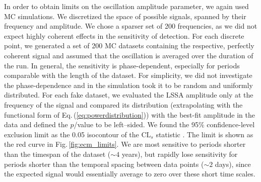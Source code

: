 In order to obtain limits on the oscillation amplitude parameter, we again used MC simulations. We discretized the space of possible signals, spanned by their frequency and amplitude. We chose a sparser set of 200 frequencies, as we did not expect highly coherent effects in the sensitivity of detection. For each discrete point, we generated a set of 200 MC
datasets containing the respective, perfectly coherent signal and assumed that the oscillation is averaged over the duration of the run. In general, the sensitivity is phase-dependent, especially for periods comparable with the length of the dataset. For simplicity, we did not investigate the phase-dependence and in the simulation took it to be random and uniformly distributed.
For each fake dataset, we evaluated the LSSA amplitude only at the frequency of the signal and compared its distribution (extrapolating with the functional form of Eq.\,(\ref{eq:powerdistribution})) with the best-fit amplitude in the data and defined the $p$\-/value to be left--sided. We found the 95\% confidence-level exclusion limit as the 0.05 isocontour of the $\mathrm{CL}_s$ statistic \cite{PDG2016}.
The limit is shown as the red curve in Fig.\,\ref{fig:ecm_limits}.
We are most sensitive to periods shorter than the timespan of the dataset ($\sim 4$ years), %
but rapidly lose sensitivity for periods shorter than the temporal spacing between data points ($\sim 2$ days), since the expected signal would essentially average to zero over these short time scales.


